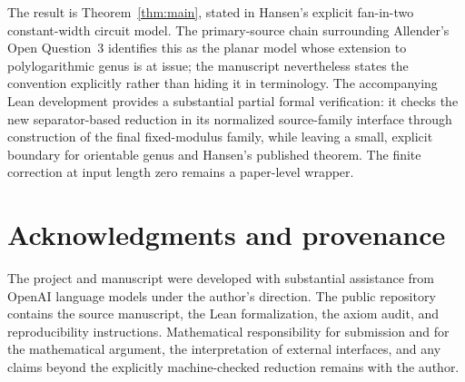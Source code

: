 \documentclass[11pt]{article}
\theoremstyle{definition}
\begin{document}
The result is Theorem~\ref{thm:main}, stated in Hansen's explicit fan-in-two
constant-width circuit model.  The primary-source chain surrounding Allender's
Open Question~3 identifies this as the planar model whose extension to
polylogarithmic genus is at issue; the manuscript nevertheless states the
convention explicitly rather than hiding it in terminology.  The accompanying
Lean development provides a substantial partial formal verification: it checks
the new separator-based reduction in its normalized source-family interface
through construction of the final fixed-modulus family, while leaving a small,
explicit boundary for orientable genus and Hansen's published theorem.  The
finite correction at input length zero remains a paper-level wrapper.

\section*{Acknowledgments and provenance}

The project and manuscript were developed with substantial assistance from
OpenAI language models under the author's direction.  The public repository
contains the source manuscript, the Lean formalization, the axiom audit, and
reproducibility instructions.  Mathematical responsibility for submission and
for the mathematical argument, the interpretation of external interfaces, and
any claims beyond the explicitly machine-checked reduction remains with the
author.
\end{document}
